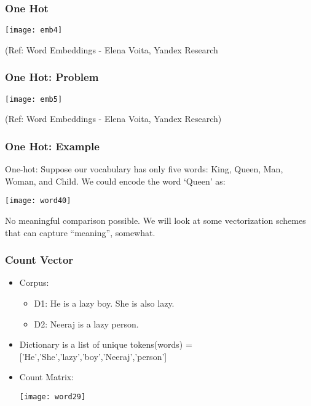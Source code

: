 \begin{frame}[fragile]\frametitle{One Hot}
\begin{center}
\texttt{[image: emb4]}
\end{center}

{\tiny (Ref: Word Embeddings - Elena Voita, Yandex Research}
\end{frame}


\begin{frame}[fragile]\frametitle{One Hot: Problem}
\begin{center}
\texttt{[image: emb5]}
\end{center}

{\tiny (Ref: Word Embeddings - Elena Voita, Yandex Research)}
\end{frame}

\begin{frame}[fragile]\frametitle{One Hot: Example}
One-hot:  Suppose our vocabulary has only five words: King, Queen, Man, Woman, and Child. We could encode the word `Queen' as:
\begin{center}
\texttt{[image: word40]}
\end{center}
No meaningful comparison possible. We will look at some vectorization schemes that can capture ``meaning'', somewhat.
\end{frame}


\begin{frame}[fragile]\frametitle{Count Vector}
\begin{itemize}
\item Corpus:
\begin{itemize}
\item D1: He is a lazy boy. She is also lazy.
\item D2: Neeraj is a lazy person.
\end{itemize}
\item Dictionary is a list of unique tokens(words) =['He','She','lazy','boy','Neeraj','person'] 
\item Count Matrix:
\begin{center}
\texttt{[image: word29]}
\end{center}
\end{itemize}
\end{frame}

